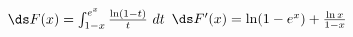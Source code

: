 {$\ds F(x) = \int_{1-x}^{e^x} \frac{\ln(1-t)}{t}\ dt$
}
{$\ds F'(x) = \ln(1-e^x)+\frac{\ln x}{1-x}$
}

